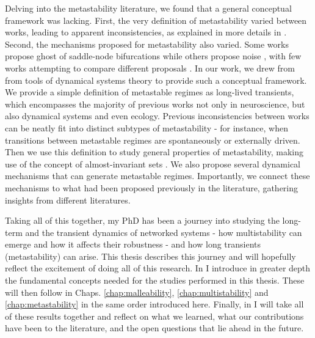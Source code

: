 Delving into the metastability literature, we found that a general conceptual framework was lacking. First, the very definition of metastability varied between works, leading to apparent inconsistencies, as explained in more details in . Second, the mechanisms proposed for metastability also varied. Some works propose ghost of saddle-node bifurcations \cite{tognoli2014metastable} while others propose noise \cite{brinkman2022metastable}, with few works attempting to compare different proposals \cite{graben2019metastable}. In our work, we drew from from tools of dynamical systems theory to provide such a conceptual framework. We provide a simple definition of metastable regimes as long-lived transients, which encompasses the majority of previous works not only in neuroscience, but also dynamical systems and even ecology. Previous inconsistencies between works can be neatly fit into distinct subtypes of metastability - for instance, when transitions between metastable regimes are spontaneously or externally driven.
Then we use this definition to study general properties of metastability, making use of the concept of almost-invariant sets \cite{dellnitz2003congestion, froyland2005statistically}. We also propose several dynamical mechanisms that can generate metastable regimes. Importantly, we connect these mechanisms to what had been proposed previously in the literature, gathering insights from different literatures.  

Taking all of this together, my PhD has been a journey into studying the long-term and the transient dynamics of networked systems - how multistability can emerge and how it affects their robustness - and how long transients (metastability) can arise.  This thesis describes this journey and will hopefully reflect the excitement of doing all of this research. In  I introduce in greater depth the fundamental concepts needed for the studies performed in this thesis. These will then follow in Chaps. \ref{chap:malleability}, \ref{chap:multistability} and \ref{chap:metastability} in the same order introduced here. Finally, in  I will take all of these results together and reflect on what we learned, what our contributions have been to the literature, and the open questions that lie ahead in the future. 

